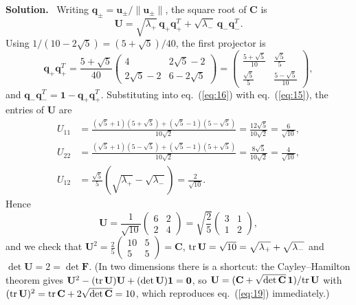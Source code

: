 \documentclass[a4paper,12pt]{paper}
\newenvironment{solution}{\par\noindent\textbf{Solution.}\ }{\par\medskip}
\begin{document}
\begin{solution}
Writing $\mathbf{q}_{\pm}=\mathbf{u}_{\pm}/\|\mathbf{u}_{\pm}\|$, the square root of $\mathbf{C}$
is
\begin{equation}
\mathbf{U}=\sqrt{\lambda_{+}}\,\mathbf{q}_{+}\mathbf{q}_{+}^{T}+\sqrt{\lambda_{-}}\,\mathbf{q}_{-}\mathbf{q}_{-}^{T}.
\label{eq:16}
\end{equation}
Using $1/(10-2\sqrt{5})=(5+\sqrt{5})/40$, the first projector is
\begin{equation}
\mathbf{q}_{+}\mathbf{q}_{+}^{T}=\frac{5+\sqrt{5}}{40}\begin{pmatrix}4&2\sqrt{5}-2\\2\sqrt{5}-2&6-2\sqrt{5}\end{pmatrix}
=\begin{pmatrix}\frac{5+\sqrt{5}}{10}&\frac{\sqrt{5}}{5}\\[4pt]\frac{\sqrt{5}}{5}&\frac{5-\sqrt{5}}{10}\end{pmatrix},
\label{eq:17}
\end{equation}
and $\mathbf{q}_{-}\mathbf{q}_{-}^{T}=\mathbf{1}-\mathbf{q}_{+}\mathbf{q}_{+}^{T}$. Substituting
into eq.~(\ref{eq:16}) with eq.~(\ref{eq:15}), the entries of $\mathbf{U}$ are
\begin{align}
U_{11}&=\frac{(\sqrt{5}+1)(5+\sqrt{5})+(\sqrt{5}-1)(5-\sqrt{5})}{10\sqrt{2}}=\frac{12\sqrt{5}}{10\sqrt{2}}=\frac{6}{\sqrt{10}},\nonumber\\
U_{22}&=\frac{(\sqrt{5}+1)(5-\sqrt{5})+(\sqrt{5}-1)(5+\sqrt{5})}{10\sqrt{2}}=\frac{8\sqrt{5}}{10\sqrt{2}}=\frac{4}{\sqrt{10}},\nonumber\\
U_{12}&=\frac{\sqrt{5}}{5}\left(\sqrt{\lambda_{+}}-\sqrt{\lambda_{-}}\right)=\frac{2}{\sqrt{10}}.
\label{eq:18}
\end{align}
Hence
\begin{equation}
\mathbf{U}=\frac{1}{\sqrt{10}}\begin{pmatrix}6&2\\2&4\end{pmatrix}
=\sqrt{\frac{2}{5}}\begin{pmatrix}3&1\\1&2\end{pmatrix},
\label{eq:19}
\end{equation}
and we check that $\mathbf{U}^{2}=\frac{2}{5}\begin{pmatrix}10&5\\5&5\end{pmatrix}=\mathbf{C}$,
$\mathrm{tr}\,\mathbf{U}=\sqrt{10}=\sqrt{\lambda_{+}}+\sqrt{\lambda_{-}}$ and
$\det\mathbf{U}=2=\det\mathbf{F}$. (In two dimensions there is a shortcut: the
Cayley--Hamilton theorem gives $\mathbf{U}^{2}-(\mathrm{tr}\,\mathbf{U})\mathbf{U}+(\det\mathbf{U})\mathbf{1}=\mathbf{0}$,
so $\mathbf{U}=(\mathbf{C}+\sqrt{\det\mathbf{C}}\,\mathbf{1})/\mathrm{tr}\,\mathbf{U}$ with
$(\mathrm{tr}\,\mathbf{U})^{2}=\mathrm{tr}\,\mathbf{C}+2\sqrt{\det\mathbf{C}}=10$, which reproduces
eq.~(\ref{eq:19}) immediately.)


\end{solution}
\end{document}
